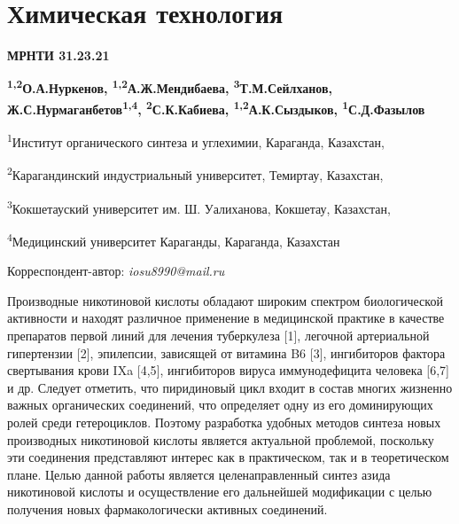 \part{Химическая технология}
{\bfseries МРНТИ 31.23.21}


\begin{center}
{\bfseries \textsuperscript{1,2}О.А.Нуркенов, \textsuperscript{1,2}А.Ж.Мендибаева, \textsuperscript{3}Т.М.Сейлханов, Ж.С.Нурмаганбетов\textsuperscript{1,4}, \textsuperscript{2}С.К.Кабиева, \textsuperscript{1,2}А.К.Сыздыков, \textsuperscript{1}С.Д.Фазылов}

\textsuperscript{1}Институт органического синтеза и углехимии,
Караганда, Казахстан,

\textsuperscript{2}Карагандинский индустриальный университет, Темиртау,
Казахстан,

\textsuperscript{3}Кокшетауский университет им. Ш. Уалиханова, Кокшетау,
Казахстан,

\textsuperscript{4}Медицинский университет Караганды, Караганда,
Казахстан

Корреспондент-автор: \emph{iosu8990@mail.ru}
\end{center}

Производные никотиновой кислоты обладают широким спектром биологической
активности и находят различное применение в медицинской практике в
качестве препаратов первой линий для лечения туберкулеза {[}1{]},
легочной артериальной гипертензии {[}2{]}, эпилепсии, зависящей от
витамина B6 {[}3{]}, ингибиторов фактора свертывания крови IXa
{[}4,5{]}, ингибиторов вируса иммунодефицита человека {[}6,7{]} и др.
Следует отметить, что пиридиновый цикл входит в состав многих жизненно
важных органических соединений, что определяет одну из его доминирующих
ролей среди гетероциклов. Поэтому разработка удобных методов синтеза
новых производных никотиновой кислоты является актуальной проблемой,
поскольку эти соединения представляют интерес как в практическом, так и
в теоретическом плане. Целью данной работы является целенаправленный
синтез азида никотиновой кислоты и осуществление его дальнейшей
модификации с целью получения новых фармакологически активных
соединений.

